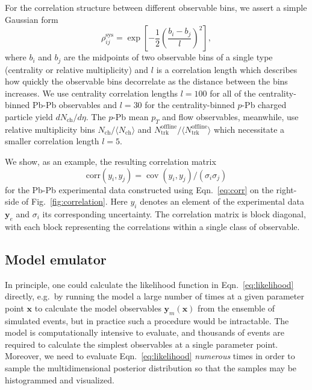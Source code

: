 \documentclass[aps,prc,reprint,amsmath,nofootinbib]{revtex4-1}
\newcommand{\nch}{N_\text{ch}}
\newcommand{\ntrk}{N_\text{trk}^\text{offline}}
\newcommand{\x}{\mathbf x}
\newcommand{\y}{\mathbf y}
\DeclareMathOperator{\cov}{cov}
\begin{document}
For the correlation structure between different observable bins, we assert a simple Gaussian form
\begin{equation}
  \label{eq:corr}
  \rho_{ij}^\text{sys} = \exp \left[ -\frac{1}{2} \left(\frac{b_i - b_j}{l} \right)^2 \right],
\end{equation}
where $b_i$ and $b_j$ are the midpoints of two observable bins of a single type (centrality or relative multiplicity) and $l$ is a correlation length which describes how quickly the observable bins decorrelate as the distance between the bins increases.
We use centrality correlation lengths $l=100$ for all of the centrality-binned Pb-Pb observables and $l=30$ for the centrality-binned $p$-Pb charged particle yield $d\nch/d\eta$.
The \mbox{$p$-Pb} mean $p_T$ and flow observables, meanwhile, use relative multiplicity bins $\nch / \langle \nch \rangle$ and $\ntrk / \langle \ntrk \rangle$ which necessitate a smaller correlation length $l=5$.

We show, as an example, the resulting correlation matrix
\begin{equation}
  \mathrm{corr}(y_i, y_j) = \cov(y_i, y_j)/(\sigma_i \sigma_j)
\end{equation}
for the Pb-Pb experimental data constructed using Eqn.~\eqref{eq:corr} on the right-side of Fig.~\ref{fig:correlation}.
Here $y_i$ denotes an element of the experimental data $\y_e$ and $\sigma_i$ its corresponding uncertainty.
The correlation matrix is block diagonal, with each block representing the correlations within a single class of observable.

\subsection{Model emulator}

In principle, one could calculate the likelihood function in Eqn.~\eqref{eq:likelihood} directly, e.g.\ by running the model a large number of times at a given parameter point $\x$ to calculate the model observables $\y_m(\x)$ from the ensemble of simulated events, but in practice such a procedure would be intractable.
The model is computationally intensive to evaluate, and thousands of events are required to calculate the simplest observables at a single parameter point.
Moreover, we need to evaluate Eqn.~\eqref{eq:likelihood} \emph{numerous} times in order to sample the multidimensional posterior distribution so that the samples may be histogrammed and visualized.
\end{document}
